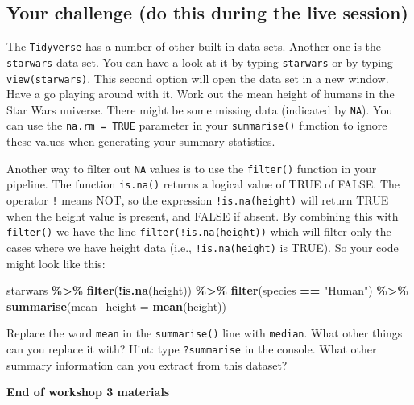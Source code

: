 \documentclass[
]{book}
\newenvironment{Shaded}{\begin{snugshade}}{\end{snugshade}}
\newcommand{\AttributeTok}[1]{\textcolor[rgb]{0.13,0.29,0.53}{#1}}
\newcommand{\FunctionTok}[1]{\textcolor[rgb]{0.13,0.29,0.53}{\textbf{#1}}}
\newcommand{\NormalTok}[1]{#1}
\newcommand{\SpecialCharTok}[1]{\textcolor[rgb]{0.81,0.36,0.00}{\textbf{#1}}}
\newcommand{\StringTok}[1]{\textcolor[rgb]{0.31,0.60,0.02}{#1}}
\begin{document}
\hypertarget{your-challenge-do-this-during-the-live-session}{%
\subsection{Your challenge (do this during the live session)}\label{your-challenge-do-this-during-the-live-session}}

The \texttt{Tidyverse} has a number of other built-in data sets. Another one is the \texttt{starwars} data set. You can have a look at it by typing \texttt{starwars} or by typing \texttt{view(starwars)}. This second option will open the data set in a new window. Have a go playing around with it. Work out the mean height of humans in the Star Wars universe. There might be some missing data (indicated by \texttt{NA}). You can use the \texttt{na.rm\ =\ TRUE} parameter in your \texttt{summarise()} function to ignore these values when generating your summary statistics.

Another way to filter out \texttt{NA} values is to use the \texttt{filter()} function in your pipeline. The function \texttt{is.na()} returns a logical value of TRUE of FALSE. The operator \texttt{!} means NOT, so the expression \texttt{!is.na(height)} will return TRUE when the height value is present, and FALSE if absent. By combining this with \texttt{filter()} we have the line \texttt{filter(!is.na(height))} which will filter only the cases where we have height data (i.e., \texttt{!is.na(height)} is TRUE). So your code might look like this:

\begin{Shaded}
\begin{Highlighting}[]
\NormalTok{starwars }\SpecialCharTok{\%\textgreater{}\%}
  \FunctionTok{filter}\NormalTok{(}\SpecialCharTok{!}\FunctionTok{is.na}\NormalTok{(height)) }\SpecialCharTok{\%\textgreater{}\%}
  \FunctionTok{filter}\NormalTok{(species }\SpecialCharTok{==} \StringTok{"Human"}\NormalTok{) }\SpecialCharTok{\%\textgreater{}\%}
  \FunctionTok{summarise}\NormalTok{(}\AttributeTok{mean\_height =} \FunctionTok{mean}\NormalTok{(height))}
\end{Highlighting}
\end{Shaded}

Replace the word \texttt{mean} in the \texttt{summarise()} line with \texttt{median}. What other things can you replace it with? Hint: type \texttt{?summarise} in the console. What other summary information can you extract from this dataset?

\textbf{End of workshop 3 materials}
\end{document}
